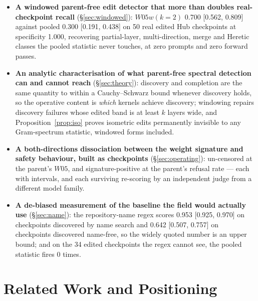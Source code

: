 \documentclass[11pt,letterpaper]{article}
\begin{document}
\begin{itemize}
  \item \textbf{A windowed parent-free edit detector that more than doubles real-checkpoint recall} (\S\ref{sec:windowed}): $W05w(k{=}2)$ 0.700 [0.562, 0.809] against pooled 0.300 [0.191, 0.438] on 50 real edited Hub checkpoints at specificity 1.000, recovering partial-layer, multi-direction, merge and Heretic classes the pooled statistic never touches, at zero prompts and zero forward passes.
  \item \textbf{An analytic characterisation of what parent-free spectral detection can and cannot reach} (\S\ref{sec:theory}): discovery and completion are the same quantity to within a Cauchy--Schwarz bound whenever discovery holds, so the operative content is \emph{which} kernels achieve discovery; windowing repairs discovery failures whose edited band is at least $k$ layers wide, and Proposition~\ref{prop:iso} proves isometric edits permanently invisible to any Gram-spectrum statistic, windowed forms included.
  \item \textbf{A both-directions dissociation between the weight signature and safety behaviour, built as checkpoints} (\S\ref{sec:operating}): un-censored at the parent's $W05$, and signature-positive at the parent's refusal rate --- each with intervals, and each surviving re-scoring by an independent judge from a different model family.
  \item \textbf{A de-biased measurement of the baseline the field would actually use} (\S\ref{sec:name}): the repository-name regex scores 0.953 [0.925, 0.970] on checkpoints discovered by name search and 0.642 [0.507, 0.757] on checkpoints discovered name-free, so the widely quoted number is an upper bound; and on the 34 edited checkpoints the regex cannot see, the pooled statistic fires 0 times.
\end{itemize}

\section{Related Work and Positioning}
\end{document}
